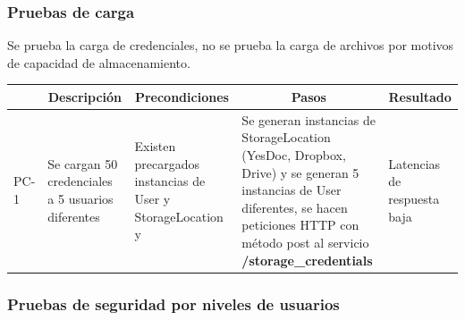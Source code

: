 \documentclass[a4paper,12pt]{article}
\begin{document}
\subsubsection{Pruebas de carga}

Se prueba la carga de credenciales, no se prueba la carga de archivos por motivos de capacidad de almacenamiento.

\begin{longtable}{|p{1.0cm}|p{3cm}|p{3cm}|p{3.5cm}|p{2.5cm}|}
	\hline \hline
		\rowcolor[gray]{0.9} 
		\multicolumn{1}{|c|}{ID} & \multicolumn{1}{|c|}{Descripción} & \multicolumn{1}{c|}{Precondiciones} & \multicolumn{1}{c|}{Pasos} &
		\multicolumn{1}{c|}{Resultado} \\
	\hline
	PC-1 & Se cargan 50 credenciales a 5 usuarios diferentes  & Existen precargados instancias de User y StorageLocation y  & Se generan instancias de StorageLocation (YesDoc, Dropbox, Drive) y se generan 5 instancias de User diferentes, se hacen peticiones HTTP con método post al servicio \textbf{/storage\_credentials} & Latencias de respuesta baja %
	\\ \hline
	
\end{longtable}

\subsubsection{Pruebas de seguridad por niveles de usuarios}
\end{document}

